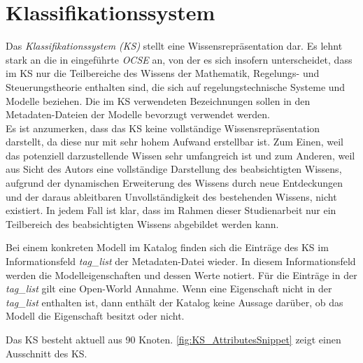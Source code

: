 \section{Klassifikationssystem}
\label{Ch:Ergebnisse:Sec:KS}
Das \textit{Klassifikationssystem (KS)} stellt eine Wissensrepräsentation dar. Es lehnt stark an die in \cite{KNHE20a} eingeführte \textit{OCSE} an, von der es sich insofern unterscheidet, dass im KS nur die Teilbereiche des Wissens der Mathematik, Regelungs- und Steuerungstheorie enthalten sind, die sich auf regelungstechnische Systeme und Modelle beziehen. Die im KS verwendeten Bezeichnungen sollen in den Metadaten-Dateien der Modelle bevorzugt verwendet werden. \\
Es ist anzumerken, dass das KS keine vollständige Wissensrepräsentation darstellt, da diese nur mit sehr hohem Aufwand erstellbar ist. Zum Einen, weil das potenziell darzustellende Wissen sehr umfangreich ist und zum Anderen, weil aus Sicht des Autors eine vollständige Darstellung des beabsichtigten Wissens, aufgrund der dynamischen Erweiterung des Wissens durch neue Entdeckungen und der daraus ableitbaren Unvollständigkeit des bestehenden Wissens, nicht existiert. In jedem Fall ist klar, dass im Rahmen dieser Studienarbeit nur ein Teilbereich des beabsichtigten Wissens abgebildet werden kann. 

Bei einem konkreten Modell im Katalog finden sich die Einträge des KS im Informationsfeld \textit{tag\_list} der Metadaten-Datei wieder. In diesem Informationsfeld werden die Modelleigenschaften und dessen Werte notiert. Für die Einträge in der \textit{tag\_list} gilt eine Open-World Annahme. Wenn eine Eigenschaft nicht in der \textit{tag\_list} enthalten ist, dann enthält der Katalog keine Aussage darüber, ob das Modell die Eigenschaft besitzt oder nicht.

Das KS besteht aktuell aus 90 Knoten. \autoref{fig:KS_AttributesSnippet} zeigt einen Ausschnitt des KS.

